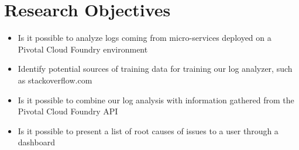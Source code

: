 \chapter{Research Objectives}

\begin{itemize}
  \item Is it possible to analyze logs coming from micro-services deployed on a Pivotal Cloud Foundry environment
  \item Identify potential sources of training data for training our log analyzer, such as stackoverflow.com
  \item Is it possible to combine our log analysis with information gathered from the Pivotal Cloud Foundry API 
  \item Is it possible to present a list of root causes of issues to a user through a dashboard
\end{itemize}